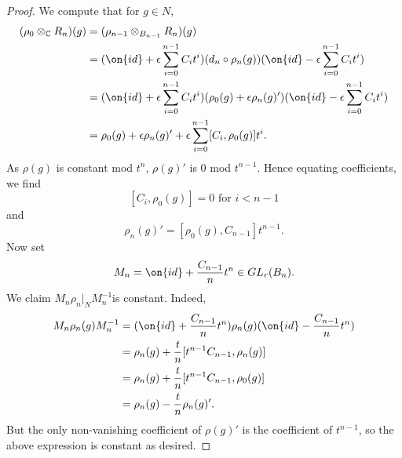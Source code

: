 \begin{proof}
We compute that for $g\in N$,
\begin{align*}
	(\rho_0\otimes_{\mathbb{C}} R_n)(g) &= (\rho_{n-1}\otimes_{B_{n-1}}R_n)(g)\\
	&=(\on{id}+\epsilon\sum_{i=0}^{n-1}C_it^i)(d_n\circ \rho_n(g))(\on{id}-\epsilon\sum_{i=0}^{n-1}C_it^i)\\
	&=(\on{id}+\epsilon\sum_{i=0}^{n-1}C_it^i)(\rho_0(g)+\epsilon\rho_n(g)')(\on{id}-\epsilon\sum_{i=0}^{n-1}C_it^i)\\
&=\rho_0(g)+\epsilon\rho_n(g)'+\epsilon\sum_{i=0}^{n-1}[C_i, \rho_{0}(g)]t^i.
\end{align*}
As $\rho(g)$ is constant mod $t^n$, $\rho(g)'$ is $0$ mod $t^{n-1}$. Hence equating coefficients, we find $$[C_i, \rho_0(g)]=0 \text{ for $i<n-1$}$$ and  $$\rho_n(g)'=[\rho_0(g), C_{n-1}]t^{n-1}.$$
Now set $$M_n=\on{id}+\frac{C_{n-1}}{n}t^n\in GL_r(B_n).$$ We claim $M_n\rho_n|_N M_n^{-1}$is constant. Indeed,
\begin{align*}
M_n\rho_n(g) M_n^{-1} &= (\on{id}+\frac{C_{n-1}}{n}t^n)\rho_n(g)(\on{id}-\frac{C_{n-1}}{n}t^n)\\
&=\rho_n(g)+\frac{t}{n}[t^{n-1}C_{n-1}, \rho_n(g)]\\
&=\rho_n(g)+\frac{t}{n}[t^{n-1}C_{n-1}, \rho_0(g)]\\
&=\rho_n(g)-\frac{t}{n}\rho_n(g)'.
\end{align*}
But the only non-vanishing coefficient of $\rho(g)'$ is the coefficient of $t^{n-1}$, so the above expression is constant as desired.
\end{proof}




